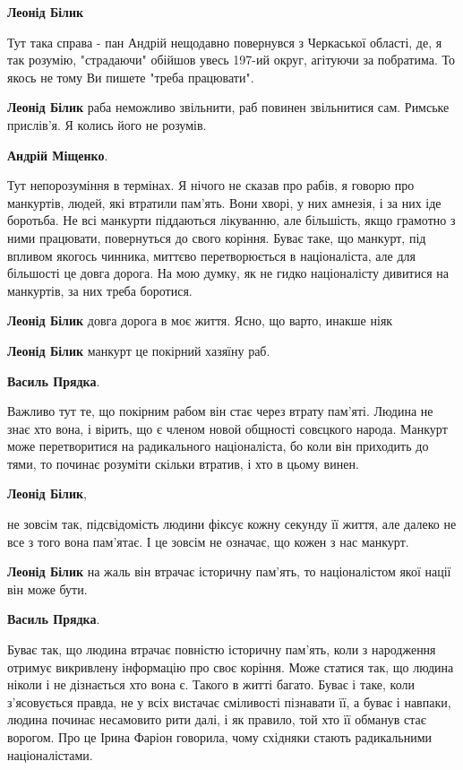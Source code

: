 \begin{itemize}
\begin{itemize}
\textbf{Леонід Білик} 

Тут така справа - пан Андрій нещодавно повернувся з Черкаської області, де, я
так розумію, "страдаючи" обійшов увесь 197-ий округ, агітуючи за побратима. То
якось не тому Ви пишете "треба працювати".

\textbf{Леонід Білик} раба неможливо звільнити, раб повинен звільнитися сам. Римське прислів'я. Я колись його не розумів.

\textbf{Андрій Міщенко}. 

Тут непорозуміння в термінах. Я нічого не сказав про рабів, я говорю про
манкуртів, людей, які втратили пам'ять. Вони хворі, у них амнезія, і за них іде
боротьба. Не всі манкурти піддаються лікуванню, але більшість, якщо грамотно з
ними працювати, повернуться до свого коріння. Буває таке, що манкурт, під
впливом якогось чинника, миттєво перетворюється в націоналіста, але для
більшості це довга дорога. На мою думку, як не гидко націоналісту дивитися на
манкуртів, за них треба боротися.

\textbf{Леонід Білик} довга дорога в моє життя. Ясно, що варто, инакше ніяк

\textbf{Леонід Білик} манкурт це покірний хазяїну раб.

\textbf{Василь Прядка}. 

Важливо тут те, що покірним рабом він стає через втрату пам'яті. Людина не знає
хто вона, і вірить, що є членом новой общності совєцкого народа. Манкурт може
перетворитися на радикального націоналіста, бо коли він приходить до тями, то
починає розуміти скільки втратив, і хто в цьому винен.

\textbf{Леонід Білик}, 

не зовсім так, підсвідомість людини фіксує кожну секунду її життя, але далеко
не все з того вона пам'ятає. І це зовсім не означає, що кожен з нас манкурт.

\textbf{Леонід Білик} на жаль він втрачає історичну пам’ять, то націоналістом якої нації він може бути.

\textbf{Василь Прядка}. 

Буває так, що людина втрачає повністю історичну пам'ять, коли з народження
отримує викривлену інформацію про своє коріння. Може статися так, що людина
ніколи і не дізнається хто вона є. Такого в житті багато. Буває і таке, коли
з'ясовується правда, не у всіх вистачає сміливості пізнавати її, а буває і
навпаки, людина починає несамовито рити далі, і як правило, той хто її обманув
стає ворогом. Про це Ірина Фаріон говорила, чому східняки стають радикальними
націоналістами.


\end{itemize}
\end{itemize}
